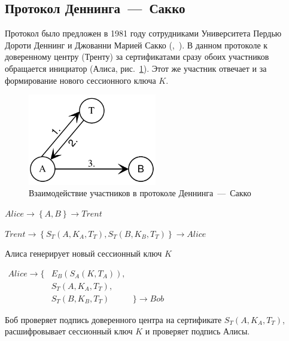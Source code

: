 \subsection{Протокол Деннинга~---~Сакко}

Протокол было предложен в 1981 году сотрудниками Университета Пердью Дороти Деннинг и Джованни Марией Сакко (,~\cite{Denning:Sacco:1981}). В данном протоколе к доверенному центру (Тренту) за сертификатами сразу обоих участников обращается инициатор (Алиса, рис.~\ref{fig:denning-sacco}). Этот же участник отвечает и за формирование нового сессионного ключа $K$.

\begin{figure}
    \centering
    \includegraphics[width=0.5\textwidth]{pic/denning-sacco}
    \caption{Взаимодействие участников в протоколе Деннинга~---~Сакко\label{fig:denning-sacco}}
\end{figure}

\begin{protocol}
    \item[(1)] $Alice \to \left\{ A, B \right\} \to Trent$
    \item[(2)] $Trent \to \left\{ S_T( A, K_A, T_T ), S_T( B, K_B, T_T ) \right\} \to Alice$
	\item[(3)] Алиса генерирует новый сессионный ключ $K$
	\item[{}] $\begin{array}{lll}
Alice \to \{ & E_B( S_A ( K, T_A ) ), & \\ 
             & S_T( A, K_A, T_T ),    & \\ 
             & S_T( B, K_B, T_T )     & \} \to Bob
\end{array}$
	\item[(4)] Боб проверяет подпись доверенного центра на сертификате $S_T( A, K_A, T_T )$, расшифровывает сессионный ключ $K$ и проверяет подпись Алисы.
\end{protocol}

